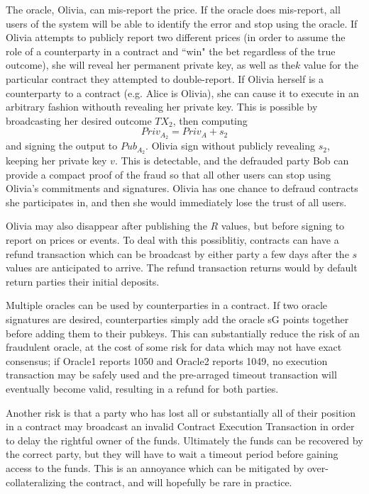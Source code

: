 \documentclass[11pt]{article}
\begin{document}
The oracle, Olivia, can mis-report the price.  If the oracle does mis-report, all users of the system will be able to identify the error and stop using the oracle.  If Olivia attempts to publicly report two different prices (in order to assume the role of a counterparty in a contract and ``win" the bet regardless of the true outcome), she will reveal her permanent private key, as well as the\(k\) value for the particular contract they attempted to double-report.
If Olivia herself is a counterparty to a contract (e.g. Alice is Olivia), she can cause it to execute in an arbitrary fashion withouth revealing her private key.  This is possible by broadcasting her desired outcome \(TX_{2}\), then computing 
\[Priv_{A_2} =  Priv_{A} + s_{2}\]
and signing the output to \(Pub_{A_2}\).  Olivia sign without publicly revealing \(s_2\), keeping her private key \(v\).  This is detectable, and the defrauded party Bob can provide a compact proof of the fraud so that all other users can stop using Olivia's commitments and signatures.  Olivia has one chance to defraud contracts she participates in, and then she would immediately lose the trust of all users.

Olivia may also disappear after publishing the \(R\) values, but before signing to report on prices or events.  To deal with this possiblitiy, contracts can have a refund transaction which can be broadcast by either party a few days after the \(s\) values are anticipated to arrive.  The refund transaction returns would by default return parties their initial deposits.


Multiple oracles can be used by counterparties in a contract.  If two oracle signatures are desired, counterparties simply add the oracle sG points together before adding them to their pubkeys.  This can substantially reduce the risk of an fraudulent oracle, at the cost of some risk for data which may not have exact consensus; if Oracle1 reports 1050 and Oracle2 reports 1049, no execution transaction may be safely used and the pre-arraged timeout transaction will eventually become valid, resulting in a refund for both parties.

Another risk is that a party who has lost all or substantially all of their position in a contract may broadcast an invalid Contract Execution Transaction in order to delay the rightful owner of the funds.  Ultimately the funds can be recovered by the correct party, but they will have to wait a timeout period before gaining access to the funds.  This is an annoyance which can be mitigated by over-collateralizing the contract, and will hopefully be rare in practice.
\end{document}
